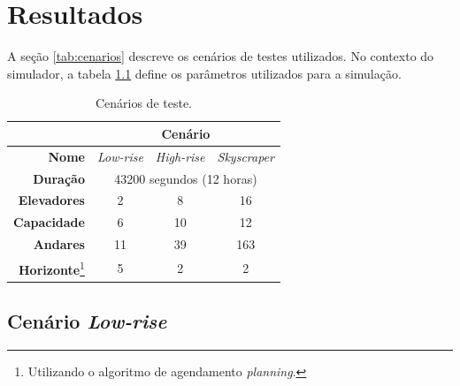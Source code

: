 \chapter{\label{chap:results}Resultados}

A seção \ref{tab:cenarios} descreve os cenários de testes utilizados. No
contexto do simulador, a tabela \ref{tab:scenarios} define os parâmetros
utilizados para a simulação.

\begin{table}[htb!]
\centering
\caption{Cenários de teste.}
\label{tab:scenarios}
\begin{tabular}{|r|c|c|c|}
\hline
\multicolumn{1}{|c|}{\textbf{}} & \multicolumn{3}{c|}{\textbf{Cenário}}                        \\ \hline
\textbf{Nome}                   & \textit{Low-rise} & \textit{High-rise} & \textit{Skyscraper} \\ \hline
\textbf{Duração}                & \multicolumn{3}{c|}{43200 segundos (12 horas)}               \\ \hline
\textbf{Elevadores}             & 2                 & 8                  & 16                  \\ \hline
\textbf{Capacidade}             & 6                 & 10                 & 12                  \\ \hline
\textbf{Andares}                & 11                & 39                 & 163                 \\ \hline
\textbf{Horizonte}\footnote{Utilizando o algoritmo de agendamento \textit{planning}.}   & 5                 & 2                  & 2                   \\ \hline
\end{tabular}
\end{table}

\section{Cenário \textit{Low-rise}}

\lipsum[1]

